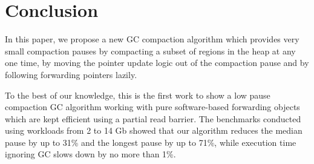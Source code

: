 \documentclass[sigplan,10pt,review,anonymous]{acmart}\settopmatter{printfolios=true,printccs=false,printacmref=false}
\def\bestMedian{31\%\xspace}
\def\bestWorst{71\%\xspace}
\begin{document}
\section{Conclusion}
\label{sec:conclusion}

In this paper, we propose a new GC compaction algorithm which provides very small compaction pauses by compacting a subset of regions in the heap at any one time, by moving the pointer update logic out of the compaction pause and by following forwarding pointers lazily. 

To the best of our knowledge, this is the first work to show a low pause compaction GC algorithm working with pure software-based forwarding objects which are kept efficient using a partial read barrier.
The benchmarks conducted using workloads from 2 to 14 Gb showed that our algorithm reduces the median pause by up to \bestMedian and the longest pause by up to \bestWorst, while execution time ignoring GC slows down by no more than 1\%.








\end{document}
